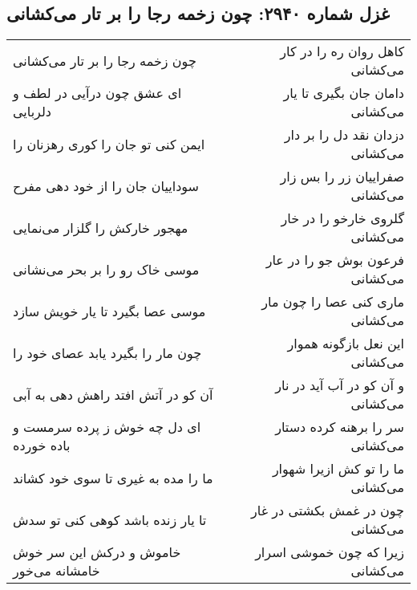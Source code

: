 \begin{center}
\section*{غزل شماره ۲۹۴۰: چون زخمه رجا را بر تار می‌کشانی}
\label{sec:2940}
\begin{longtable}{l p{0.5cm} r}
چون زخمه رجا را بر تار می‌کشانی
&&
کاهل روان ره را در کار می‌کشانی
\\
ای عشق چون درآیی در لطف و دلربایی
&&
دامان جان بگیری تا یار می‌کشانی
\\
ایمن کنی تو جان را کوری رهزنان را
&&
دزدان نقد دل را بر دار می‌کشانی
\\
سوداییان جان را از خود دهی مفرح
&&
صفراییان زر را بس زار می‌کشانی
\\
مهجور خارکش را گلزار می‌نمایی
&&
گلروی خارخو را در خار می‌کشانی
\\
موسی خاک رو را بر بحر می‌نشانی
&&
فرعون بوش جو را در عار می‌کشانی
\\
موسی عصا بگیرد تا یار خویش سازد
&&
ماری کنی عصا را چون مار می‌کشانی
\\
چون مار را بگیرد یابد عصای خود را
&&
این نعل بازگونه هموار می‌کشانی
\\
آن کو در آتش افتد راهش دهی به آبی
&&
و آن کو در آب آید در نار می‌کشانی
\\
ای دل چه خوش ز پرده سرمست و باده خورده
&&
سر را برهنه کرده دستار می‌کشانی
\\
ما را مده به غیری تا سوی خود کشاند
&&
ما را تو کش ازیرا شهوار می‌کشانی
\\
تا یار زنده باشد کوهی کنی تو سدش
&&
چون در غمش بکشتی در غار می‌کشانی
\\
خاموش و درکش این سر خوش خامشانه می‌خور
&&
زیرا که چون خموشی اسرار می‌کشانی
\\
\end{longtable}
\end{center}
